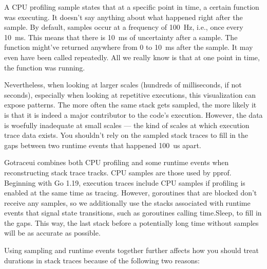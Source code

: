\documentclass[10pt,letterpaper,oneside,openany,showtrims]{memoir}
\newcommand{\code}[1]{{\ttfamily\mbox{#1}}}
\begin{document}
A CPU profiling sample states that at a specific point in time, a certain function was executing.
It doesn't say anything about what happened right after the sample.
By default, samples occur at a frequency of \unit{100 Hz}, i.e., once every \unit{10 ms}.
This means that there is \unit{10 ms} of uncertainty after a sample.
The function might've returned anywhere from \unit{0} to \unit{10 ms} after the sample.
It may even have been called repeatedly.
All we really know is that at one point in time, the function was running.

Nevertheless, when looking at larger scales (hundreds of milliseconds, if not seconds),
especially when looking at repetitive executions,
this visualization can expose patterns.
The more often the same stack gets sampled, the more likely it is that it is indeed a major contributor to the code's execution.
However, the data is woefully inadequate at small scales --- the kind of scales at which execution trace data exists.
You shouldn't rely on the sampled stack traces to fill in the gaps between two runtime events that happened \unit{100 us} apart.

Gotraceui combines both CPU profiling and some runtime events when reconstructing stack trace tracks.
CPU samples are those used by pprof.
Beginning with Go 1.19, execution traces include CPU samples if profiling is enabled at the same time as tracing.
However, goroutines that are blocked don't receive any samples, so we additionally use
the stacks associated with runtime events that signal state transitions, such as goroutines calling \code{time.Sleep},
to fill in the gaps.
This way, the last stack before a potentially long time without samples will be as accurate as possible.

Using sampling and runtime events together further affects how you should treat durations in stack traces
because of the following two reasons:
\end{document}
